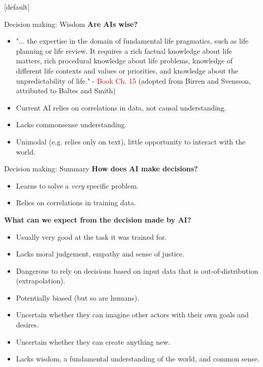 \documentclass[8pt]{beamer}
\begin{document}
	[default]

	\begin{frame}{Decision making: Wisdom}
		\textbf{Are AIs wise?}
		\begin{itemize}
			\item "... the expertise in the domain of fundamental life pragmatics, such as life planning or life review. It requires a rich factual knowledge about life matters, rich procedural knowledge about life problems, knowledge of different life contexts and values or priorities, and knowledge about the unpredictability of life." - \textcolor{red}{Book Ch. 15} (adopted from Birren and Svensson, attributed to Baltes and Smith)
			\item Current AI relies on correlations in data, not causal understanding.
			\item Lacks commonsense understanding.
			\item Unimodal (e.g. relies only on text), little opportunity to interact with the world.
		\end{itemize}
	\end{frame}

	\begin{frame}{Decision making: Summary}
		\textbf{How does AI make decisions?}
		\begin{itemize}
			\item Learns to solve a \textit{very} specific problem.
			\item Relies on correlations in training data.
		\end{itemize}
		\textbf{What can we expect from the decision made by AI?}
		\begin{itemize}
			\item Usually very good at the task it was trained for.
			\item Lacks moral judgement, empathy and sense of justice.
			\item Dangerous to rely on decisions based on input data that is out-of-distribution (extrapolation).
			\item Potentially biased (but so are humans).
			\item Uncertain whether they can imagine other actors with their own goals and desires.
			\item Uncertain whether they can create anything new.
			\item Lacks wisdom, a fundamental understanding of the world, and common sense.
		\end{itemize}
	\end{frame}
\end{document}
